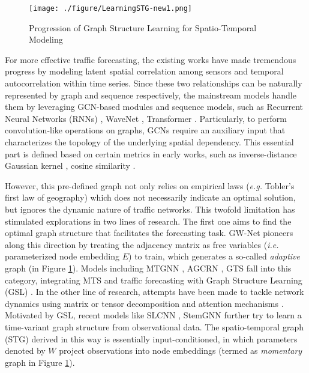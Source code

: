 \documentclass[letterpaper]{article} \usepackage{aaai23}  \usepackage{times}  \usepackage{helvet}  \usepackage{courier}  \usepackage[hyphens]{url}  \usepackage{graphicx} \urlstyle{rm} \def\UrlFont{\rm}  \usepackage{natbib}  \usepackage{caption} \usepackage{multirow}
\begin{document}
\begin{figure}[t]
	\centering
	\texttt{[image: ./figure/LearningSTG-new1.png]}
	\caption{Progression of Graph Structure Learning for Spatio-Temporal Modeling}
	\vspace{-12pt}
	\label{fig:intro}
\end{figure}

For more effective traffic forecasting, the existing works have made tremendous progress by modeling latent spatial correlation among sensors and temporal autocorrelation within time series. Since these two relationships can be naturally represented by graph and sequence respectively, the mainstream models handle them by leveraging GCN-based modules \cite{diao2019dynamic, guo2019attention, geng2019spatiotemporal, zhang2021traffic} and sequence models, such as Recurrent Neural Networks (RNNs) \cite{li2018diffusion, bai2020adaptive, ye2021coupled}, WaveNet \cite{wu2019graph}, Transformer \cite{zheng2020gman, wang2020traffic, xu2020spatial}. Particularly, to perform convolution-like operations on graphs, GCNs require an auxiliary input that characterizes the topology of the underlying spatial dependency. This essential part is defined based on certain metrics in early works, such as inverse-distance Gaussian kernel \cite{yu2018spatio, li2018diffusion}, cosine similarity \cite{geng2019spatiotemporal}. 

However, this pre-defined graph not only relies on empirical laws (\textit{e.g.} Tobler's first law of geography) which does not necessarily indicate an optimal solution, but ignores the dynamic nature of traffic networks. This twofold limitation has stimulated explorations in two lines of research. The first one aims to find the optimal graph structure that facilitates the forecasting task. GW-Net \cite{wu2019graph} pioneers along this direction by treating the adjacency matrix as free variables (\textit{i.e.} parameterized node embedding $E$) to train, which generates a so-called \textit{adaptive} graph (in Figure \ref{fig:intro}). Models including MTGNN \cite{wu2020connecting}, AGCRN \cite{bai2020adaptive}, GTS \cite{shang2021discrete} fall into this category, integrating MTS and traffic forecasting with Graph Structure Learning (GSL) \cite{zhu2021deep}. In the other line of research, attempts have been made to tackle network dynamics using matrix or tensor decomposition \cite{diao2019dynamic, ye2021coupled} and attention mechanisms \cite{guo2019attention, zheng2020gman}. Motivated by GSL, recent models like SLCNN \cite{zhang2020spatio}, StemGNN \cite{cao2020spectral} further try to learn a time-variant graph structure from observational data. The spatio-temporal graph (STG) derived in this way is essentially input-conditioned, in which parameters denoted by $W$ project observations into node embeddings (termed as \textit{momentary} graph in Figure \ref{fig:intro}).
\end{document}

